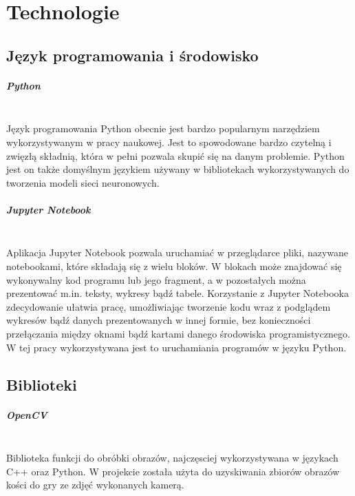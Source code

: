 
\chapter{Technologie}
\section{Język programowania i środowisko}

\paragraph{Python} \mbox{}\\
Język programowania Python obecnie jest bardzo popularnym narzędziem wykorzystywanym
w pracy naukowej. Jest to spowodowane bardzo czytelną i zwięzłą składnią,
która w pełni pozwala skupić się na danym problemie. Python jest on także domyślnym
językiem używany w bibliotekach wykorzystywanych do tworzenia modeli sieci neuronowych.

\paragraph{Jupyter Notebook} \mbox{}\\
Aplikacja Jupyter Notebook pozwala uruchamiać w przeglądarce pliki, nazywane notebookami,
które składają się z wielu bloków. W blokach może znajdować się wykonywalny kod programu
lub jego fragment, a w pozostałych można prezentować m.in. teksty, wykresy bądź tabele.
Korzystanie z Jupyter Notebooka zdecydowanie ułatwia pracę, umożliwiając tworzenie
kodu wraz z podglądem wykresów bądź danych prezentowanych w innej formie, bez
konieczności przełączania między oknami bądź kartami danego środowiska programistycznego.\\
W tej pracy wykorzystywana jest to uruchamiania programów w języku Python.

\section{Biblioteki}

\paragraph{OpenCV} \mbox{}\\
Biblioteka funkcji do obróbki obrazów, najczęsciej wykorzystywana w językach C++
oraz Python. W projekcie została użyta do uzyskiwania zbiorów obrazów kości do gry
ze zdjęć wykonanych kamerą.


